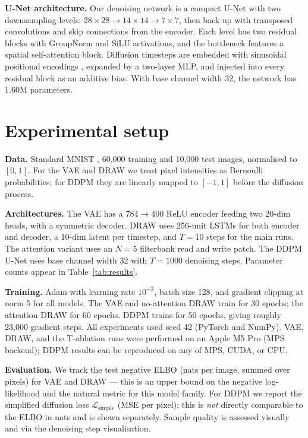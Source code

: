 \documentclass{article}
\newcommand{\ddpmParams}{1.60M}
\begin{document}
\textbf{U-Net architecture.}
Our denoising network is a compact U-Net with two downsampling levels:
\(28\!\times\!28 \to 14\!\times\!14 \to 7\!\times\!7\), then back up with
transposed convolutions and skip connections from the encoder.
Each level has two residual blocks with GroupNorm and SiLU activations,
and the bottleneck features a spatial self-attention block.
Diffusion timesteps are embedded with sinusoidal positional encodings
\citep{ho2020ddpm}, expanded by a two-layer MLP, and injected into every
residual block as an additive bias.
With base channel width 32, the network has \ddpmParams{} parameters.

\section{Experimental setup}
\label{sec:setup}

\textbf{Data.}
Standard MNIST \citep{lecun1998mnist}, 60{,}000 training and 10{,}000 test
images, normalised to \([0,1]\). For the VAE and DRAW we treat pixel
intensities as Bernoulli probabilities; for DDPM they are linearly mapped
to \([-1,1]\) before the diffusion process.

\textbf{Architectures.}
The VAE has a 784\(\to\)400 ReLU encoder feeding two 20-dim heads, with a
symmetric decoder.
DRAW uses 256-unit LSTMs for both encoder and decoder, a 10-dim latent per
timestep, and \(T=10\) steps for the main runs.
The attention variant uses an \(N=5\) filterbank read and write patch.
The DDPM U-Net uses base channel width 32 with \(T=1000\) denoising steps.
Parameter counts appear in Table~\ref{tab:results}.

\textbf{Training.}
Adam \citep{kingma2015adam} with learning rate \(10^{-3}\), batch size 128,
and gradient clipping at norm \(5\) for all models.
The VAE and no-attention DRAW train for 30 epochs; the attention DRAW for
60 epochs.
DDPM trains for 50 epochs, giving roughly 23{,}000 gradient steps.
All experiments used seed 42 (PyTorch and NumPy).
VAE, DRAW, and the T-ablation runs were performed on an Apple M5 Pro (MPS
backend); DDPM results can be reproduced on any of MPS, CUDA, or CPU.

\textbf{Evaluation.}
We track the test negative ELBO (nats per image, summed over pixels) for
VAE and DRAW --- this is an upper bound on the negative log-likelihood and
the natural metric for this model family.
For DDPM we report the simplified diffusion loss
\(\mathcal{L}_{\mathrm{simple}}\) (MSE per pixel); this is \emph{not}
directly comparable to the ELBO in nats and is shown separately.
Sample quality is assessed visually and via the denoising step visualisation.
\end{document}
